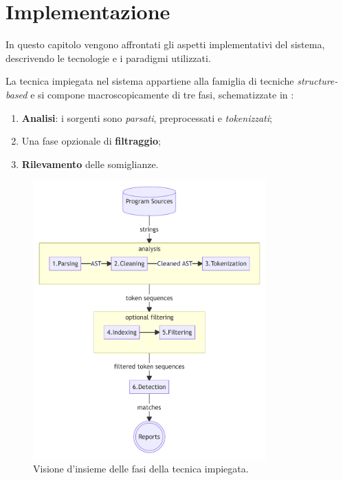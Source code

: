 \chapter{Implementazione}
\label{chapter:implementation}
In questo capitolo vengono affrontati gli aspetti implementativi del sistema, descrivendo le tecnologie e i paradigmi utilizzati.

\vspace*{0.5cm}

La tecnica impiegata nel sistema appartiene alla famiglia di tecniche \textit{structure-based} e si compone macroscopicamente di tre fasi, schematizzate in :
\begin{enumerate}
	\item \textbf{Analisi}: i sorgenti sono \textit{parsati}, preprocessati e \textit{tokenizzati};
	\item Una fase opzionale di \textbf{filtraggio};
	\item \textbf{Rilevamento} delle somiglianze.
\end{enumerate}

\begin{figure}[h!]
    \centering
    \includegraphics[width=0.8\textwidth]{resources/img/03-system-overview.pdf}
    \caption{Visione d'insieme delle fasi della tecnica impiegata.}
    \label{img:03-system-overview}
\end{figure}

